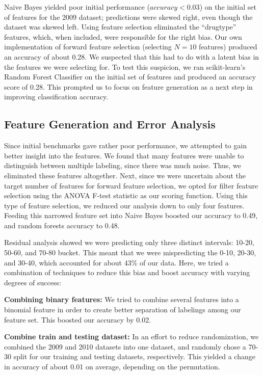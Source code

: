 \documentclass[english]{article}
\begin{document}
Naive Bayes yielded poor initial performance ($accuracy < 0.03$) on the initial set of features for the 2009 dataset; predictions were skewed right, even though the dataset was skewed left.
Using feature selection eliminated the ``drugtype'' features, which, when included, were responsible for the right bias.
Our own implementation of forward feature selection (selecting $N=10$ features) produced an accuracy of about 0.28.
We suspected that this had to do with a latent bias in the features we were selecting for. To test this suspicion, we ran scikit-learn’s Random Forest Classifier on the initial set of features and produced an accuracy score of 0.28.
This prompted us to focus on feature generation as a next step in improving classification accuracy.

\subsection{Feature Generation and Error Analysis}

Since initial benchmarks gave rather poor performance, we attempted to gain better insight into the features. We found that many features were unable to distinguish between multiple labeling, since there was much noise. Thus, we eliminated these features altogether. Next, since we were uncertain about the target number of features for forward feature selection, we opted for filter feature selection using the ANOVA F-test statistic as our scoring function. Using this type of feature selection, we reduced our analysis down to only four features. Feeding this narrowed feature set into Naive Bayes boosted our accuracy to 0.49, and random forests accuracy to 0.48.

Residual analysis showed we were predicting only three distinct intervals: 10-20, 50-60, and 70-80 bucket. This meant that we were mispredicting the 0-10, 20-30, and 30-40, which accounted for about 43\% of our data. Here, we tried a combination of techniques to reduce this bias and boost accuracy with varying degrees of success:

{\bf Combining binary features:}
We tried to combine several features into a binomial feature in order to create better separation of labelings among our feature set. This boosted our accuracy by 0.02.

{\bf Combine train and testing dataset:}
In an effort to reduce randomization, we combined the 2009 and 2010 datasets into one dataset, and randomly chose a 70-30 split for our training and testing datasets, respectively. This yielded a change in accuracy of about 0.01 on average, depending on the permutation.
\end{document}
